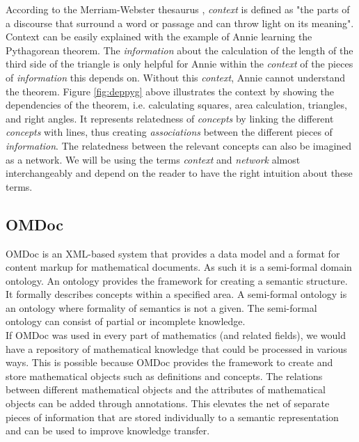\documentclass[twoside, 12pt]{article}
\begin{document}
According to the Merriam-Webster thesaurus \cite{Webster:npentrel14}, \textit{context} is defined as "the parts of a discourse that surround a word or passage and can throw light on its meaning". Context can be easily explained with the example of Annie learning the Pythagorean theorem. The \textit{information} about the calculation of the length of the third side of the triangle is only helpful for Annie within the \textit{context} of the pieces of \textit{information} this depends on. Without this \textit{context}, Annie cannot understand the theorem. Figure \ref{fig:deppyg} above illustrates the context by showing the dependencies of the theorem, i.e. calculating squares, area calculation, triangles, and right angles. It represents relatedness of \textit{concepts} by linking the different \textit{concepts} with lines, thus creating \textit{associations} between the different pieces of \textit{information}. The relatedness between the relevant concepts can also be imagined as a network. We will be using the terms \textit{context} and \textit{network} almost interchangeably and depend on the reader to have the right intuition about these terms.

\subsection{OMDoc}
\label{sec:OMDoc}

OMDoc \cite{Kohlhase:OMDoc1.2} is an XML-based system that provides a data model and a format for content markup for mathematical documents. As such it is a semi-formal domain ontology. An ontology provides the framework for creating a semantic structure. It formally describes concepts within a specified area. A semi-formal ontology \cite{Sheth:npentrel14} is an ontology where formality of semantics is not a given. The semi-formal ontology can consist of partial or incomplete knowledge. \\

If OMDoc was used in every part of mathematics (and related fields), we would have a repository of mathematical knowledge that could be processed in various ways. This is possible because OMDoc provides the framework to create and store mathematical objects such as definitions and concepts. The relations between different mathematical objects and the attributes of mathematical objects can be added through annotations. This elevates the net of separate pieces of information that are stored individually to a semantic representation and can be used to improve knowledge transfer.
\end{document}
